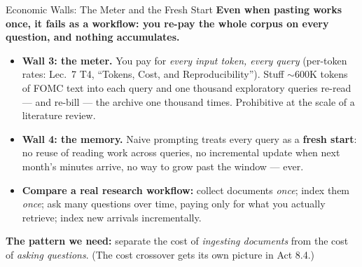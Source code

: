 \begin{frame}{Economic Walls: The Meter and the Fresh Start}
\textbf{Even when pasting works once, it fails as a workflow: you re-pay the whole corpus on every question, and nothing accumulates.}

\medskip
\begin{itemize}
\item \textbf{Wall 3: the meter.} You pay for \emph{every input token, every query} (per-token rates: Lec.\ 7 T4, ``Tokens, Cost, and Reproducibility''). Stuff $\sim$600K tokens of FOMC text into each query and one thousand exploratory queries re-read --- and re-bill --- the archive one thousand times. Prohibitive at the scale of a literature review.

\medskip
\item \textbf{Wall 4: the memory.} Naive prompting treats every query as a \textbf{fresh start}: no reuse of reading work across queries, no incremental update when next month's minutes arrive, no way to grow past the window --- ever.

\smallskip
\item \textbf{Compare a real research workflow:} collect documents \emph{once}; index them \emph{once}; ask many questions over time, paying only for what you actually retrieve; index new arrivals incrementally.
\end{itemize}

\smallskip
\begin{takeawaybox}
\textbf{The pattern we need:} separate the cost of \emph{ingesting documents} from the cost of \emph{asking questions}. (The cost crossover gets its own picture in Act 8.4.)
\end{takeawaybox}
\end{frame}

